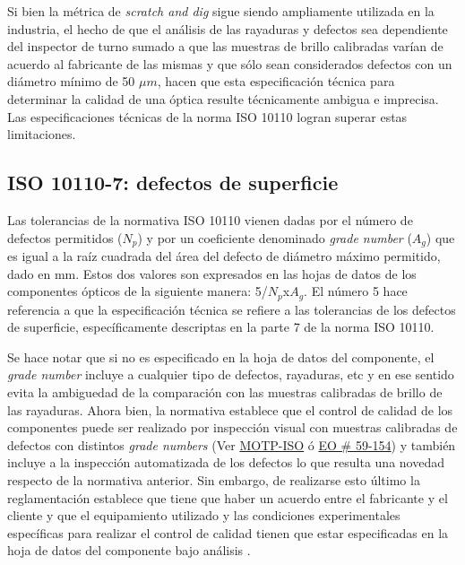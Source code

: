 Si bien la métrica de \textit{scratch and dig} sigue siendo ampliamente utilizada en la industria, el hecho de que el análisis de las rayaduras y defectos sea dependiente del inspector de turno sumado a que las muestras de brillo calibradas varían de acuerdo al fabricante de las mismas y que sólo sean considerados defectos con un diámetro mínimo de 50 $\mu m$, hacen que esta especificación técnica para determinar la calidad de una óptica resulte técnicamente ambigua e imprecisa. Las especificaciones técnicas de la norma ISO 10110 logran superar estas limitaciones.

\singlespacing
\subsection{ISO 10110-7: defectos de superficie}
\label{sec:iso10110}


\hspace{0.5cm}Las tolerancias de la normativa ISO 10110 vienen dadas por el número de defectos permitidos ($N_{p}$) y por un coeficiente denominado \textit{grade number} ($A_{g}$) que es igual a la raíz cuadrada del área del defecto de diámetro máximo permitido, dado en mm. Estos dos valores son expresados en las hojas de datos de los componentes ópticos de la siguiente manera: 5/$N_{p}$x$A_{g}$. El número 5 hace referencia a que la especificación técnica se refiere a las tolerancias de los defectos de superficie, específicamente descriptas en la parte 7 de la norma ISO 10110. 

Se hace notar que si no es especificado en la hoja de datos del componente, el \textit{grade number} incluye a cualquier tipo de defectos, rayaduras, etc y en ese sentido evita la ambiguedad de la comparación con las muestras calibradas de brillo de las rayaduras. Ahora bien, la normativa establece que el control de calidad de los componentes puede ser realizado por inspección visual con muestras calibradas de defectos con distintos \textit{grade numbers} (Ver \href{https://www.thorlabs.com/thorproduct.cfm?partnumber=MOTP-ISO}{MOTP-ISO} ó \href{https://www.edmundoptics.com/p/scratch-amp-dig-target-1st-surface-positive/15899/}{EO \# 59-154}) y también incluye a la inspección automatizada de los defectos lo que resulta una novedad respecto de la normativa anterior. Sin embargo, de realizarse esto último la reglamentación establece que tiene que haber un acuerdo entre el fabricante y el cliente y que el equipamiento utilizado y las condiciones experimentales específicas para realizar el control de calidad tienen que estar especificadas en la hoja de datos del componente bajo análisis \cite{acuerdocon}.

